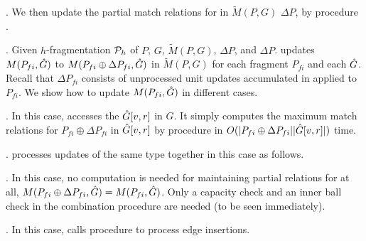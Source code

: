 
. We then update the partial match relations for \affballsx in $\tilde{M}(P,G)$ \wrt $\Delta P$,
by procedure \incmatch.


. Given $h$-fragmentation ${\cal P}_{h}$ of $P$, $G$, $\tilde{M}(P,G)$, $\Delta P$, \upl and \affballsx \wrt $\Delta P$.
\incmatch updates $M(P_{fi}, \hat{G}{})$ to $M(P_{fi}\oplus\Delta P_{fi}, \hat{G}{})$ in $\tilde{M}(P,G)$ for each fragment $P_{fi}$ and each \affballx $\hat{G}{}$.
Recall that $\Delta P_{fi}$ consists of unprocessed unit updates accumulated in \upl applied to $P_{fi}$.
We show how to update $M(P_{fi}, \hat{G}{})$ in different cases.




.
In this case, \incmatch accesses the \affballx $\hat{G}{[v,r]}$ in $G$.
It simply computes the maximum match relations for $P_{fi}\oplus \Delta P_{fi}$ in $\hat{G}{[v,r]}$
by procedure \rgraphsim in $O(|P_{fi}\oplus \Delta P_{fi}||\hat{G}{[v,r]}|)$ time.

.
\incmatch processes updates of the same type together in this case as follows.

.
In this case, no computation is needed for maintaining partial relations for \affballsx at all,
\ie $M(P_{fi}\oplus\Delta P_{fi}, \hat{G}{}) = M(P_{fi}, \hat{G}{})$.
Only a capacity check and an inner ball check in the combination procedure are needed (to be seen immediately).




.
In this case, \incmatch calls procedure \patedgeinsert to process edge insertions.



